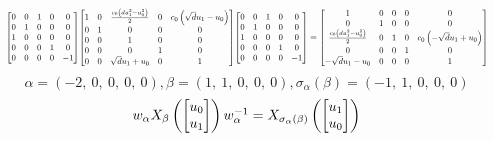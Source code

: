 \documentclass[11pt]{article}
\theoremstyle{definition}
\begin{document}
\[
\scaletoalign{\textwidth}{{\left[\begin{matrix}0 & 0 & 1 & 0 & 0\\0 & 1 & 0 & 0 & 0\\1 & 0 & 0 & 0 & 0\\0 & 0 & 0 & 1 & 0\\0 & 0 & 0 & 0 & -1\end{matrix}\right]} {\left[\begin{matrix}1 & 0 & \frac{c_{0} \left(d u_{1}^{2} - u_{0}^{2}\right)}{2} & 0 & c_{0} \left(\sqrt{d} u_{1} - u_{0}\right)\\0 & 1 & 0 & 0 & 0\\0 & 0 & 1 & 0 & 0\\0 & 0 & 0 & 1 & 0\\0 & 0 & \sqrt{d} u_{1} + u_{0} & 0 & 1\end{matrix}\right]} {\left[\begin{matrix}0 & 0 & 1 & 0 & 0\\0 & 1 & 0 & 0 & 0\\1 & 0 & 0 & 0 & 0\\0 & 0 & 0 & 1 & 0\\0 & 0 & 0 & 0 & -1\end{matrix}\right]} = {\left[\begin{matrix}1 & 0 & 0 & 0 & 0\\0 & 1 & 0 & 0 & 0\\\frac{c_{0} \left(d u_{1}^{2} - u_{0}^{2}\right)}{2} & 0 & 1 & 0 & c_{0} \left(- \sqrt{d} u_{1} + u_{0}\right)\\0 & 0 & 0 & 1 & 0\\- \sqrt{d} u_{1} - u_{0} & 0 & 0 & 0 & 1\end{matrix}\right]}}
\]
\[
\alpha = \left( -2, \  0, \  0, \  0, \  0\right), \beta = \left( 1, \  1, \  0, \  0, \  0\right), \sigma_{\alpha}(\beta) = \left( -1, \  1, \  0, \  0, \  0\right)
\]
\[
\scaletoalign{\textwidth}{w_{\alpha} X_{\beta}\left(\left[\begin{matrix}u_{0}\\u_{1}\end{matrix}\right]\right) w_{\alpha}^{-1} = X_{\sigma_{\alpha}\left(\beta\right)}\left(\left[\begin{matrix}u_{1}\\u_{0}\end{matrix}\right]\right)}
\]
\end{document}
